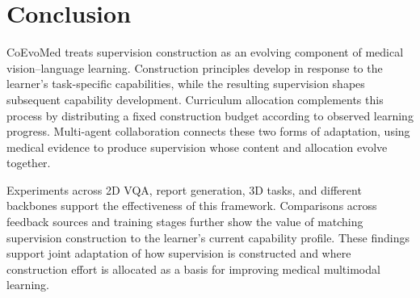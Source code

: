 \section{Conclusion}
\label{sec:conclusion}

CoEvoMed treats supervision construction as an evolving component of medical vision--language learning. Construction principles develop in response to the learner's task-specific capabilities, while the resulting supervision shapes subsequent capability development. Curriculum allocation complements this process by distributing a fixed construction budget according to observed learning progress. Multi-agent collaboration connects these two forms of adaptation, using medical evidence to produce supervision whose content and allocation evolve together.

Experiments across 2D VQA, report generation, 3D tasks, and different backbones support the effectiveness of this framework. Comparisons across feedback sources and training stages further show the value of matching supervision construction to the learner's current capability profile. These findings support joint adaptation of how supervision is constructed and where construction effort is allocated as a basis for improving medical multimodal learning.
